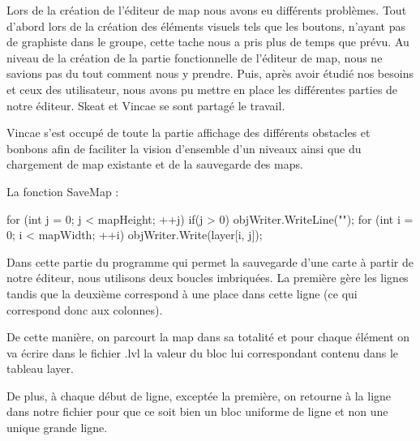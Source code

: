 \documentclass [11pt]{report}
\begin{document}
						\vspace{10mm}
			
			
		
			 	
			 \indent Lors de la création de l'éditeur de map nous avons eu différents problèmes. Tout d'abord lors de la création des éléments visuels tels que les boutons, n'ayant pas de graphiste dans le groupe, cette tache nous a pris plus de temps que prévu. Au niveau de la création de la partie fonctionnelle de l'éditeur de map, nous ne savions pas du tout comment nous y prendre. Puis, après avoir étudié nos besoins et ceux des utilisateur, nous avons pu mettre en place les différentes parties de notre éditeur. Skeat et Vincae se sont partagé le travail.
			 
			 Vincae s'est occupé de toute la partie affichage des différents obstacles et bonbons afin de faciliter la vision d'ensemble d'un niveaux ainsi que du chargement de map existante et de la sauvegarde des maps.\\
			 
			 
			 
	\newpage
		
	\noindent La fonction SaveMap : 
			 
	 \begin{mylisting}
	
      for (int j = 0; j < mapHeight; ++j)
      {
        if(j > 0)
           objWriter.WriteLine("");
        for (int i = 0; i < mapWidth; ++i)
        {
           objWriter.Write(layer[i, j]);
        }
      }
      
	\end{mylisting}
		
		
		\vspace{10mm}
		
		
		
		Dans cette partie du programme qui permet la sauvegarde d'une carte à partir de  notre éditeur, nous utilisons deux boucles imbriquées. La première gère les lignes tandis que la deuxième correspond à une place dans cette ligne (ce qui correspond donc aux colonnes).
		
		De cette manière, on parcourt la map dans sa totalité et pour chaque élément on va écrire dans le fichier .lvl la valeur du bloc lui correspondant contenu dans le tableau layer. 
		
		De plus, à chaque début de ligne, exceptée la première, on retourne à la ligne dans notre fichier pour que ce soit bien un bloc uniforme de ligne et non une unique grande ligne.\\
		
\end{document}
